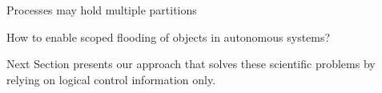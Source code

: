 \begin{definition}
  Processes may hold multiple partitions 
   
\end{definition}

\begin{problem}
  How to enable scoped flooding of objects in autonomous systems?
\end{problem}

Next Section presents our approach that solves these scientific
problems by relying on logical control information only.


